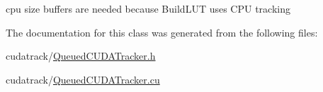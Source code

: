 cpu size buffers are needed because Build\+L\+UT uses C\+PU tracking 



The documentation for this class was generated from the following files\+:\begin{DoxyCompactItemize}
\item 
cudatrack/\hyperlink{_queued_c_u_d_a_tracker_8h}{Queued\+C\+U\+D\+A\+Tracker.\+h}\item 
cudatrack/\hyperlink{_queued_c_u_d_a_tracker_8cu}{Queued\+C\+U\+D\+A\+Tracker.\+cu}\end{DoxyCompactItemize}
